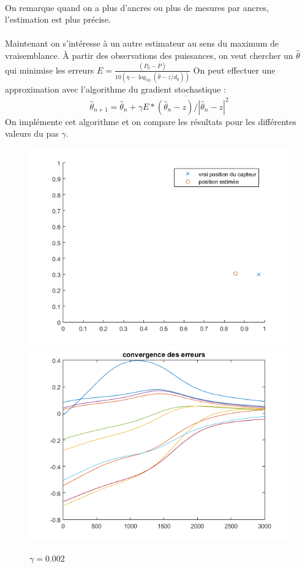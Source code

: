 \documentclass{article}
\begin{document}
\\On remarque quand on a plus d'ancres ou plus de mesures par ancres, l'estimation est plus pr\'ecise.
\paragraph{} Maintenant on s'int\'eresse \`a un autre estimateur au sens du maximum de vraisemblance. \`A partir des observations des puissances, on veut chercher un $\widehat{\theta}$ qui minimise les erreurs $E =\frac{(P_{0}-\overline{P})}{10(\eta-\log_10 (\widehat{\theta}-z/d_{0}))}$ On peut effectuer une approximation avec l'algorithme du gradient stochastique :
\[
\widehat{\theta}_{n+1} = \widehat{\theta}_{n} + \gamma\overline{E*(\widehat{\theta}_{n}-z)/\left|\widehat{\theta}_{n}-z\right|^{2}}
\]
On impl\'emente cet algorithme et on compare les r\'esultats pour les diff\'erentes valeurs du pas $\gamma$.
\begin{figure}[!h]
\includegraphics[scale=0.35]{grad_gamma0002.png} \includegraphics[scale=0.35]{grad_err_gamma0002.png} 
\caption{$\gamma=0.002$}
\end{figure} 
\end{document}
